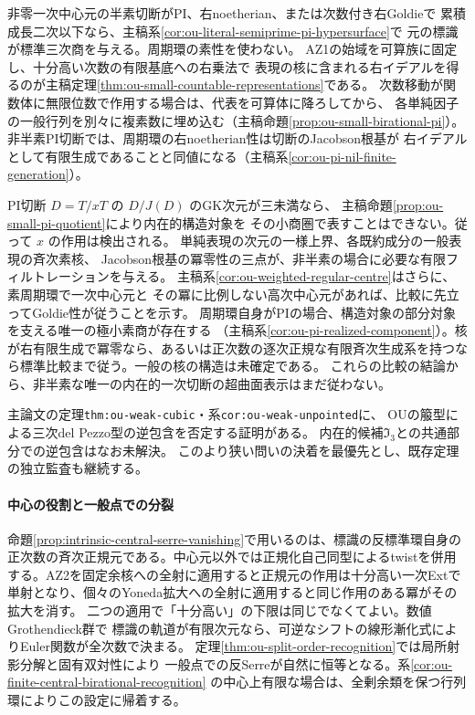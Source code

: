 \documentclass[11pt,a4paper]{ltjsarticle}
\begin{document}
非零一次中心元の半素切断がPI、右noetherian、または次数付き右Goldieで
累積成長二次以下なら、主稿系\ref{cor:ou-literal-semiprime-pi-hypersurface}で
元の標識が標準三次商を与える。周期環の素性を使わない。
AZ1の始域を可算族に固定し、十分高い次数の有限基底への右乗法で
表現の核に含まれる右イデアルを得るのが主稿定理\ref{thm:ou-small-countable-representations}である。
次数移動が関数体に無限位数で作用する場合は、代表を可算体に降ろしてから、
各単純因子の一般行列を別々に複素数に埋め込む（主稿命題\ref{prop:ou-small-birational-pi}）。
非半素PI切断では、周期環の右noetherian性は切断のJacobson根基が
右イデアルとして有限生成であることと同値になる（主稿系\ref{cor:ou-pi-nil-finite-generation}）。

PI切断 $D=T/xT$ の $D/J(D)$ のGK次元が三未満なら、
主稿命題\ref{prop:ou-small-pi-quotient}により内在的構造対象を
その小商圏で表すことはできない。従って $x$ の作用は検出される。
単純表現の次元の一様上界、各既約成分の一般表現の斉次素核、
Jacobson根基の冪零性の三点が、非半素の場合に必要な有限フィルトレーションを与える。
主稿系\ref{cor:ou-weighted-regular-centre}はさらに、素周期環で一次中心元と
その冪に比例しない高次中心元があれば、比較に先立ってGoldie性が従うことを示す。
周期環自身がPIの場合、構造対象の部分対象を支える唯一の極小素商が存在する
（主稿系\ref{cor:ou-pi-realized-component}）。核が右有限生成で冪零なら、あるいは正次数の逐次正規な有限斉次生成系を持つなら標準比較まで従う。一般の核の構造は未確定である。
これらの比較の結論から、非半素な唯一の内在的一次切断の超曲面表示はまだ従わない。

主論文の定理\texttt{thm:ou-weak-cubic}・系\texttt{cor:ou-weak-unpointed}に、
OUの箙型による三次del Pezzo型の逆包含を否定する証明がある。
内在的候補$\mathfrak I_3$との共通部分での逆包含はなお未解決。
このより狭い問いの決着を最優先とし、既存定理の独立監査も継続する。

\paragraph{中心の役割と一般点での分裂}
命題\ref{prop:intrinsic-central-serre-vanishing}で用いるのは、標識の反標準環自身の
正次数の斉次正規元である。中心元以外では正規化自己同型によるtwistを併用する。AZ2を固定余核への全射に適用すると正規元の作用は十分高い一次Extで
単射となり、個々のYoneda拡大への全射に適用すると同じ作用のある冪がその拡大を消す。
二つの適用で「十分高い」の下限は同じでなくてよい。数値Grothendieck群で
標識の軌道が有限次元なら、可逆なシフトの線形漸化式によりEuler関数が全次数で決まる。
定理\ref{thm:ou-split-order-recognition}では局所射影分解と固有双対性により
一般点での反Serreが自然に恒等となる。系\ref{cor:ou-finite-central-birational-recognition}
の中心上有限な場合は、全剰余類を保つ行列環によりこの設定に帰着する。
\end{document}
